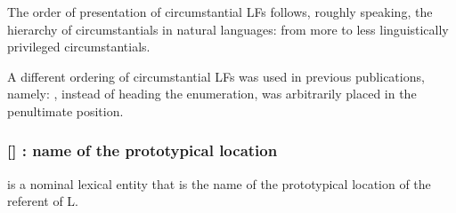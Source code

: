 The order of presentation of circumstantial LFs follows, roughly speaking, the hierarchy of circumstantials in natural languages: from more to less linguistically privileged circumstantials.

\begin{historicalremark}
A different ordering of circumstantial LFs was used in previous publications, namely: , instead of heading the enumeration, was arbitrarily placed in the penultimate position.
\end{historicalremark}

\subsubsection*{{\small []}  : name of the prototypical location}\label{lf:S-loc}

 is a nominal lexical entity that is the name of the prototypical location of the referent of L.

